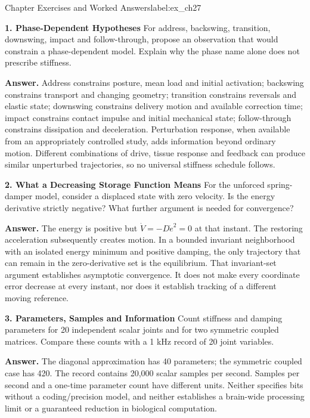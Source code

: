 \begin{exercises}{Chapter Exercises and Worked Answers}{label:ex_ch27}

\textbf{1. Phase-Dependent Hypotheses}
\label{ex:impedance_phase}
For address, backswing, transition, downswing, impact and follow-through, propose an observation that would constrain a phase-dependent model. Explain why the phase name alone does not prescribe stiffness.

\textbf{Answer.} Address constrains posture, mean load and initial activation; backswing constrains transport and changing geometry; transition constrains reversals and elastic state; downswing constrains delivery motion and available correction time; impact constrains contact impulse and initial mechanical state; follow-through constrains dissipation and deceleration. Perturbation response, when available from an appropriately controlled study, adds information beyond ordinary motion. Different combinations of drive, tissue response and feedback can produce similar unperturbed trajectories, so no universal stiffness schedule follows.

\textbf{2. What a Decreasing Storage Function Means}
\label{ex:lyapunov_intuition}
For the unforced spring-damper model, consider a displaced state with zero velocity. Is the energy derivative strictly negative? What further argument is needed for convergence?

\textbf{Answer.} The energy is positive but $\dot V=-D\dot e^2=0$ at that instant. The restoring acceleration subsequently creates motion. In a bounded invariant neighborhood with an isolated energy minimum and positive damping, the only trajectory that can remain in the zero-derivative set is the equilibrium. That invariant-set argument establishes asymptotic convergence. It does not make every coordinate error decrease at every instant, nor does it establish tracking of a different moving reference.

\textbf{3. Parameters, Samples and Information}
\label{ex:bandwidth_reduction}
Count stiffness and damping parameters for 20 independent scalar joints and for two symmetric coupled matrices. Compare these counts with a 1 kHz record of 20 joint variables.

\textbf{Answer.} The diagonal approximation has 40 parameters; the symmetric coupled case has 420. The record contains 20,000 scalar samples per second. Samples per second and a one-time parameter count have different units. Neither specifies bits without a coding/precision model, and neither establishes a brain-wide processing limit or a guaranteed reduction in biological computation.


\end{exercises}
